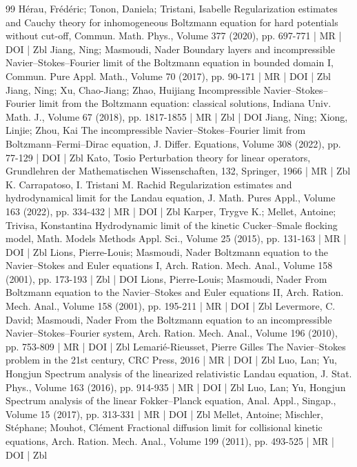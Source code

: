 \documentclass[10pt]{amsart}
\theoremstyle{definition}\newtheorem{defi}[theo]{Definition}\newtheorem{rema}[theo]{Remark}\newtheorem{exam}[theo]{Example}\newtheorem{exem}[theo]{Example}\newtheorem{nota}[theo]{Notation}
\begin{document}
\begin{thebibliography}{99}
 Hérau, Frédéric; Tonon, Daniela; Tristani, Isabelle Regularization estimates and Cauchy theory for inhomogeneous Boltzmann equation for hard potentials without cut-off, Commun. Math. Phys., Volume 377 (2020), pp. 697-771 | MR | DOI | Zbl
 Jiang, Ning; Masmoudi, Nader Boundary layers and incompressible Navier–Stokes–Fourier limit of the Boltzmann equation in bounded domain I, Commun. Pure Appl. Math., Volume 70 (2017), pp. 90-171 | MR | DOI | Zbl
 Jiang, Ning; Xu, Chao-Jiang; Zhao, Huijiang Incompressible Navier–Stokes–Fourier limit from the Boltzmann equation: classical solutions, Indiana Univ. Math. J., Volume 67 (2018), pp. 1817-1855 | MR | Zbl | DOI
 Jiang, Ning; Xiong, Linjie; Zhou, Kai The incompressible Navier–Stokes–Fourier limit from Boltzmann–Fermi–Dirac equation, J. Differ. Equations, Volume 308 (2022), pp. 77-129 | DOI | Zbl
 Kato, Tosio Perturbation theory for linear operators, Grundlehren der Mathematischen Wissenschaften, 132, Springer, 1966 | MR | Zbl
 K. Carrapatoso, I. Tristani M. Rachid Regularization estimates and hydrodynamical limit for the Landau equation, J. Math. Pures Appl., Volume 163 (2022), pp. 334-432 | MR | DOI | Zbl
 Karper, Trygve K.; Mellet, Antoine; Trivisa, Konstantina Hydrodynamic limit of the kinetic Cucker–Smale flocking model, Math. Models Methods Appl. Sci., Volume 25 (2015), pp. 131-163 | MR | DOI | Zbl
 Lions, Pierre-Louis; Masmoudi, Nader Boltzmann equation to the Navier–Stokes and Euler equations I, Arch. Ration. Mech. Anal., Volume 158 (2001), pp. 173-193 | Zbl | DOI
 Lions, Pierre-Louis; Masmoudi, Nader From Boltzmann equation to the Navier–Stokes and Euler equations II, Arch. Ration. Mech. Anal., Volume 158 (2001), pp. 195-211 | MR | DOI | Zbl
 Levermore, C. David; Masmoudi, Nader From the Boltzmann equation to an incompressible Navier–Stokes–Fourier system, Arch. Ration. Mech. Anal., Volume 196 (2010), pp. 753-809 | MR | DOI | Zbl
 Lemarié-Rieusset, Pierre Gilles The Navier–Stokes problem in the 21st century, CRC Press, 2016 | MR | DOI | Zbl
 Luo, Lan; Yu, Hongjun Spectrum analysis of the linearized relativistic Landau equation, J. Stat. Phys., Volume 163 (2016), pp. 914-935 | MR | DOI | Zbl
 Luo, Lan; Yu, Hongjun Spectrum analysis of the linear Fokker–Planck equation, Anal. Appl., Singap., Volume 15 (2017), pp. 313-331 | MR | DOI | Zbl
 Mellet, Antoine; Mischler, Stéphane; Mouhot, Clément Fractional diffusion limit for collisional kinetic equations, Arch. Ration. Mech. Anal., Volume 199 (2011), pp. 493-525 | MR | DOI | Zbl

\end{thebibliography}
\end{document}

